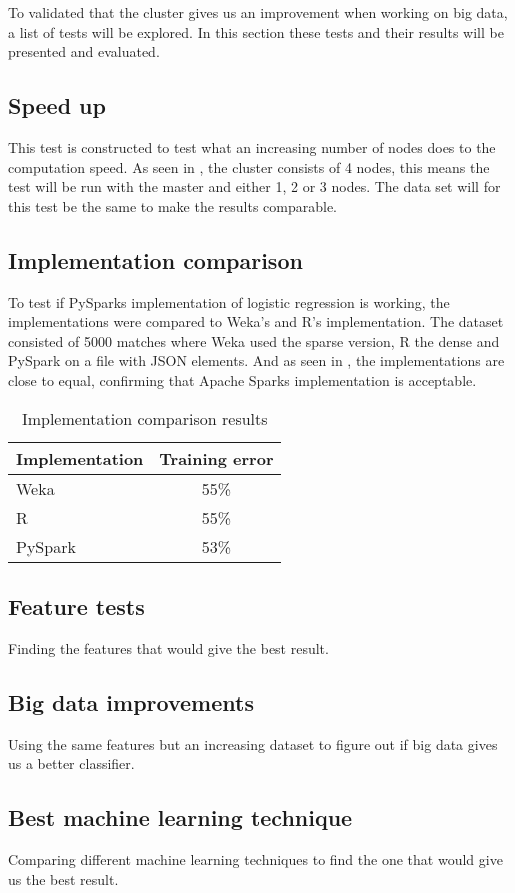 To validated that the cluster gives us an improvement when working on big data, a list of tests will be explored. In this section these tests and their results will be presented and evaluated.

\subsection{Speed up}
This test is constructed to test what an increasing number of nodes does to the computation speed. As seen in , the cluster consists of 4 nodes, this means the test will be run with the master and either 1, 2 or 3 nodes. The data set will for this test be the same to make the results comparable. 

\subsection{Implementation comparison}
To test if PySparks implementation of logistic regression is working, the implementations were compared to Weka's and R's implementation. The dataset consisted of 5000 matches where Weka used the sparse version, R the dense and PySpark on a file with JSON elements. And as seen in , the implementations are close to equal, confirming that Apache Sparks implementation is acceptable. 

\begin{table}[!htb]
  \centering
  \begin{tabular}{|l|c|}
\hline
    Implementation  & Training error  \\
\hline
    Weka & 55\%  \\
    R & 55\%\\
    PySpark & 53\%\\ 
\hline
  \end{tabular}
  \caption{Implementation comparison results}
  \label{tab:impl_results}
\end{table}
\FloatBarrier
\subsection{Feature tests}
Finding the features that would give the best result.

\subsection{Big data improvements}
Using the same features but an increasing dataset to figure out if big data gives us a better classifier.

\subsection{Best machine learning technique}
Comparing different machine learning techniques to find the one that would give us the best result.







